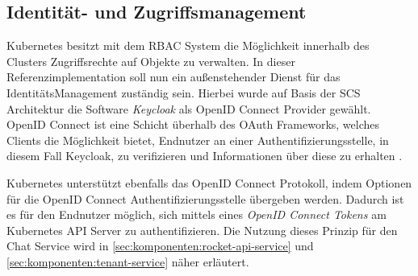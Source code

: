 \subsection{Identität- und Zugriffsmanagement}
Kubernetes besitzt mit dem \ac{RBAC} System die Möglichkeit innerhalb des Clusters Zugriffsrechte auf Objekte
zu verwalten. In dieser Referenzimplementation soll nun ein außenstehender Dienst für das IdentitätsManagement
zuständig sein. Hierbei wurde auf Basis der \ac{SCS} Architektur die Software \emph{Keycloak} als OpenID Connect Provider gewählt.
OpenID Connect ist eine Schicht überhalb des OAuth Frameworks, welches Clients die Möglichkeit bietet, Endnutzer
an einer Authentifizierungsstelle, in diesem Fall Keycloak, zu verifizieren und Informationen über diese zu erhalten \cite{OpenID2021}.


Kubernetes unterstützt ebenfalls das OpenID Connect Protokoll, indem Optionen für die OpenID Connect Authentifizierungsstelle
übergeben werden. Dadurch ist es für den Endnutzer möglich, sich mittels eines \emph{OpenID Connect Tokens} am 
Kubernetes API Server zu authentifizieren. Die Nutzung dieses Prinzip für den Chat Service wird 
in \ref{sec:komponenten:rocket-api-service} und \ref{sec:komponenten:tenant-service} näher erläutert.